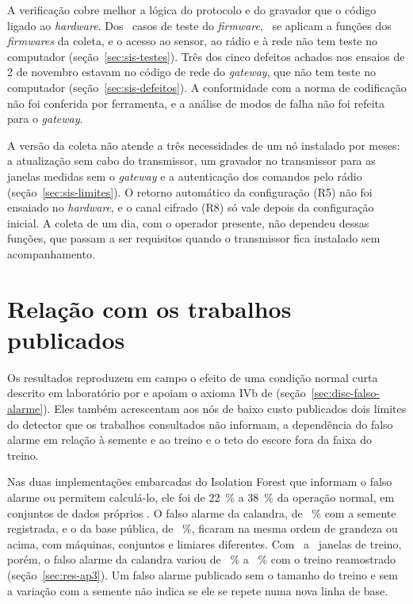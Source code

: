 A verificação cobre melhor a lógica do protocolo e do gravador que o código ligado ao \textit{hardware}. Dos \sisTestesCasos\ casos de teste do \textit{firmware}, \sisTestesCampoCasos\ se aplicam a funções dos \textit{firmwares} da coleta, e o acesso ao sensor, ao rádio e à rede não tem teste no computador (seção~\ref{sec:sis-testes}). Três dos cinco defeitos achados nos ensaios de 2 de novembro estavam no código de rede do \textit{gateway}, que não tem teste no computador (seção~\ref{sec:sis-defeitos}). A conformidade com a norma de codificação não foi conferida por ferramenta, e a análise de modos de falha não foi refeita para o \textit{gateway}.

A versão da coleta não atende a três necessidades de um nó instalado por meses: a atualização sem cabo do transmissor, um gravador no transmissor para as janelas medidas sem o \textit{gateway} e a autenticação dos comandos pelo rádio (seção~\ref{sec:sis-limites}). O retorno automático da configuração (R5) não foi ensaiado no \textit{hardware}, e o canal cifrado (R8) só vale depois da configuração inicial. A coleta de um dia, com o operador presente, não dependeu dessas funções, que passam a ser requisitos quando o transmissor fica instalado sem acompanhamento.

\section{Relação com os trabalhos publicados}\label{sec:disc-literatura}

Os resultados reproduzem em campo o efeito de uma condição normal curta descrito em laboratório por  e apoiam o axioma IVb de  (seção~\ref{sec:disc-falso-alarme}). Eles também acrescentam aos nós de baixo custo publicados dois limites do detector que os trabalhos consultados não informam, a dependência do falso alarme em relação à semente e ao treino e o teto do escore fora da faixa do treino.

Nas duas implementações embarcadas do Isolation Forest que informam o falso alarme ou permitem calculá-lo, ele foi de \SI{22}{\percent} a \SI{38}{\percent} da operação normal, em conjuntos de dados próprios \cite{chevtchenko2023,kolok2025}. O falso alarme da calandra, de \hUmCalandraIFDireto~\% com a semente registrada, e o da base pública, de \hQuatroFracaoZero~\%, ficaram na mesma ordem de grandeza ou acima, com máquinas, conjuntos e limiares diferentes. Com \campoJanelasGuilhotinaUm\ a \campoJanelasCalandraUm\ janelas de treino, porém, o falso alarme da calandra variou de \apTresTreinoInfCalandra~\% a \apTresTreinoSupCalandra~\% com o treino reamostrado (seção~\ref{sec:res-ap3}). Um falso alarme publicado sem o tamanho do treino e sem a variação com a semente não indica se ele se repete numa nova linha de base.

